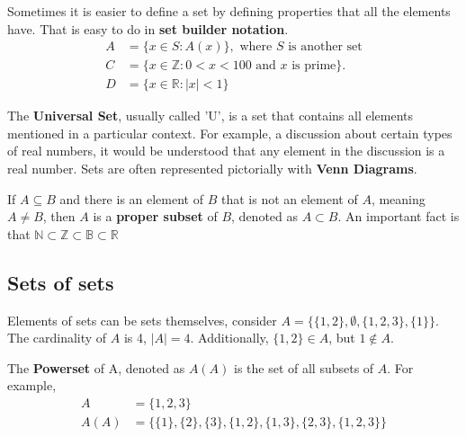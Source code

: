Sometimes it is easier to define a set by defining properties that all the elements have.
That is easy to do in \textbf{set builder notation}.
\begin{align*}
  A & = \{x \in S: A(x)\}, \text{ where $S$ is another set}                \\
  C & = \{x \in \mathbb{Z}: 0 < x < 100 \text{ and } x \text{ is prime}\}. \\
  D & = \{x \in \mathbb{R}: \left\lvert x\right\rvert < 1\}
\end{align*}

The \textbf{Universal Set}, usually called 'U', is a set that contains all elements mentioned in a particular context.
For example, a discussion about certain types of real numbers, it would be understood that any element in the discussion
is a real number. Sets are often represented pictorially with \textbf{Venn Diagrams}.

\begin{center}
\end{center}

If $A \subseteq B$ and there is an element of $B$ that is not an element of $A$, meaning $A \not = B$,
then $A$ is a \textbf{proper subset} of $B$, denoted as $A \subset B$. An important fact is that
$\mathbb{N} \subset \mathbb{Z} \subset \mathbb{B} \subset \mathbb{R}$

\subsection{Sets of sets}

Elements of sets can be sets themselves, consider $A = \{\{1, 2\}, \emptyset, \{1, 2, 3\}, \{1\}\}$.
The cardinality of $A$ is 4, $\left\lvert A\right\rvert = 4$. Additionally, $\{1, 2\} \in A$, but
$1 \not \in A$.

The \textbf{Powerset} of A, denoted as $A(A)$ is the set of all subsets of $A$. For example,
\begin{align*}
  A    & = \{1, 2, 3\}                                                        \\
  A(A) & = \{\{1\}, \{2\}, \{3\}, \{1, 2\}, \{1, 3\}, \{2, 3\}, \{1, 2, 3\}\}
\end{align*}

